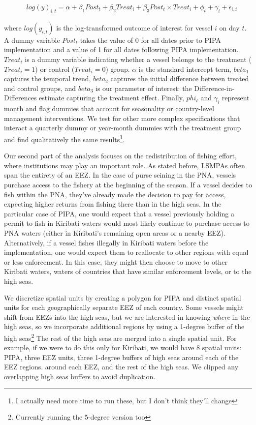\documentclass[9p,twocolumn,twoside,lineno]{pnas-new}
\begin{document}
\begin{figure}[h]
\begin{align*}
log(y)_{i,t} = \alpha + \beta_1 Post_t + \beta_2 Treat_i + \beta_3 Post_t \times Treat_i + \phi_t + \gamma_i + \epsilon_{i,t}
\label{eqn:did}
\end{align*}
\end{figure}

where $log(y_{i,t})$ is the log-transformed outcome of interest for vessel $i$ on day $t$.
A dummy variable $Post_t$ takes the value of 0 for all
dates prior to PIPA implementation and a value of 1 for all dates
following PIPA implementation. $Treat_i$ is a dummy
variable indicating whether a vessel belongs to the treatment ($Treat_i = 1$) or control
($Treat_i = 0$) group. $\alpha$ is
the standard intercept term, $beta_1$ captures the temporal trend,
$beta_2$ captures the initial difference between treated and control groups,
and $beta_3$ is our parameter of interest: the Difference-in-Differences estimate capturing
the treatment effect. Finally, $phi_t$ and $\gamma_i$ represent
month and flag dummies that account for seasonality or
country-level management interventions. We test for other more complex specifications
that interact a quarterly dummy or year-month dummies with the treatment group
and find qualitatively the same results\footnote{I actually need more time to run these, but I don't think they'll change}.

Our second part of the analysis focuses on the redistribution of fishing
effort, where institutions may play an important role. As stated
before, LSMPAs often span the entirety of an EEZ. In the case of purse
seining in the PNA, vessels purchase access to the fishery at the
beginning of the season. If a vessel decides to fish within the PNA,
they've already made the decision to pay for access, expecting higher
returns from fishing there than in the high seas. In the particular case
of PIPA, one would expect that a vessel previously holding a permit to fish in
Kiribati waters would 
most likely continue to purchase access to PNA waters (either in Kiribati's
remaining open areas or a nearby EEZ). Alternatively, if a vessel fishes illegally
in Kiribati waters before the implementation, one would expect them to
reallocate to other regions with equal or less enforcement. In this
case, they might then choose to move to other Kiribati waters, waters
of countries that have similar enforcement levels, or to the high seas.

We discretize spatial units by creating a polygon for
PIPA and distinct
spatial units for each geographically separate EEZ of each country. Some vessels might shift
from EEZs into the high seas, but we are interested in knowing
\emph{where} in the high seas, so we incorporate additional regions by
using a 1-degree buffer of the high seas\footnote{Currently running the 5-degree version too}
The rest of the high seas are merged into a single spatial unit. For
example, if we were to do this only for Kiribati, we would have 8
spatial units: PIPA, three EEZ units, three 1-degree buffers of high seas  around each of the EEZ regions.
around each EEZ, and the rest of the high seas. We clipped any overlapping
high seas buffers to avoid duplication.
\end{document}
